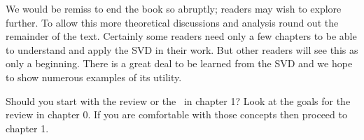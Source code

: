 We would be remiss to end the book so abruptly; readers may wish to explore further. To allow this more theoretical discussions and analysis round out the remainder of the text. Certainly some readers need only a few chapters to be able to understand and apply the SVD in their work. But other readers will see this as only a beginning. There is a great deal to be learned from the SVD and we hope to show numerous examples of its utility.

Should you start with the review or the \svdl \ in chapter 1? Look at the goals for the review in chapter 0. If you are comfortable with those concepts then proceed to chapter 1.

\endinput